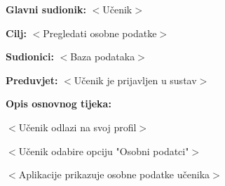 					\noindent {}
					\begin{packed_item}
	
						\item \textbf{Glavni sudionik: }$<$Učenik$>$
						\item  \textbf{Cilj:} $<$Pregledati osobne podatke$>$
						\item  \textbf{Sudionici:} $<$Baza podataka$>$
						\item  \textbf{Preduvjet:} $<$Učenik je prijavljen u sustav$>$
						\item  \textbf{Opis osnovnog tijeka:}
						
						\item[] \begin{packed_enum}
	
							\item $<$Učenik odlazi na svoj profil$>$
							\item $<$Učenik odabire opciju "Osobni podatci"$>$
							\item $<$Aplikacije prikazuje osobne podatke učenika$>$
						\end{packed_enum}
						
					\end{packed_item}


